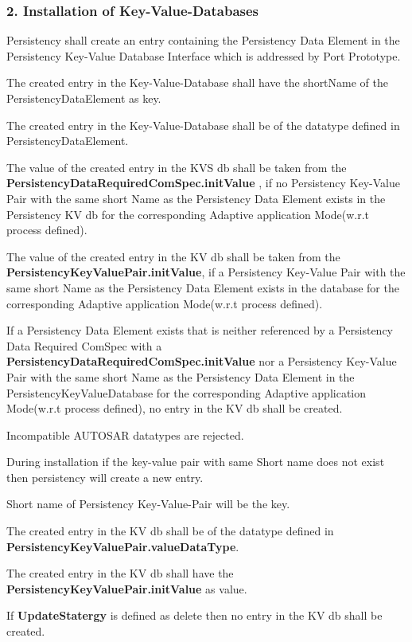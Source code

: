 \subsubsection*{2. Installation of Key-\/\+Value-\/\+Databases}


\begin{DoxyItemize}
\item Persistency shall create an entry containing the Persistency Data Element in the Persistency Key-\/\+Value Database Interface which is addressed by Port Prototype.
\item The created entry in the Key-\/\+Value-\/\+Database shall have the short\+Name of the Persistency\+Data\+Element as key.
\item The created entry in the Key-\/\+Value-\/\+Database shall be of the datatype defined in Persistency\+Data\+Element.
\item The value of the created entry in the K\+VS db shall be taken from the {\bfseries Persistency\+Data\+Required\+Com\+Spec.\+init\+Value} , if no Persistency Key-\/\+Value Pair with the same short Name as the Persistency Data Element exists in the Persistency KV db for the corresponding Adaptive application Mode(w.\+r.\+t process defined).
\item The value of the created entry in the KV db shall be taken from the {\bfseries Persistency\+Key\+Value\+Pair.\+init\+Value}, if a Persistency Key-\/\+Value Pair with the same short Name as the Persistency Data Element exists in the database for the corresponding Adaptive application Mode(w.\+r.\+t process defined).
\item If a Persistency Data Element exists that is neither referenced by a Persistency Data Required Com\+Spec with a {\bfseries Persistency\+Data\+Required\+Com\+Spec.\+init\+Value} nor a Persistency Key-\/\+Value Pair with the same short Name as the Persistency Data Element in the Persistency\+Key\+Value\+Database for the corresponding Adaptive application Mode(w.\+r.\+t process defined), no entry in the KV db shall be created.
\item Incompatible A\+U\+T\+O\+S\+AR datatypes are rejected.
\item During installation if the key-\/value pair with same Short name does not exist then persistency will create a new entry.
\item Short name of Persistency Key-\/\+Value-\/\+Pair will be the key.
\item The created entry in the KV db shall be of the datatype defined in {\bfseries Persistency\+Key\+Value\+Pair.\+value\+Data\+Type}.
\item The created entry in the KV db shall have the {\bfseries Persistency\+Key\+Value\+Pair.\+init\+Value} as value.
\item If {\bfseries Update\+Statergy} is defined as delete then no entry in the KV db shall be created.
\end{DoxyItemize}

